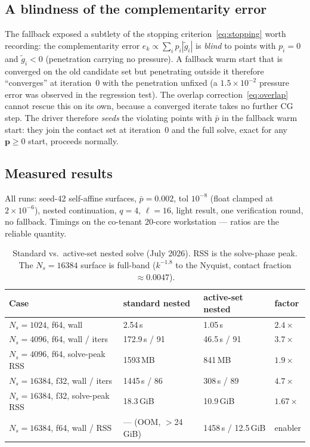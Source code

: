 \documentclass[11pt,a4paper]{article}
\newcommand{\bp}{\mathbf{p}}
\begin{document}
\subsection{A blindness of the complementarity error}
\label{sec:active-blind}

The fallback exposed a subtlety of the stopping
criterion~\eqref{eq:stopping} worth recording: the complementarity error
$e_k \propto \sum_i p_i |\tilde g_i|$ is \emph{blind} to points with
$p_i = 0$ and $\tilde g_i < 0$ (penetration carrying no pressure).  A fallback warm start that is converged on the old candidate set
but penetrating outside it therefore ``converges'' at iteration~0 with the
penetration unfixed (a $1.5\times10^{-2}$ pressure error was observed in the
regression test).  The overlap correction~\eqref{eq:overlap} cannot rescue
this on its own, because a converged iterate takes no further CG step.  The
driver therefore \emph{seeds} the violating points with $\bar p$ in the
fallback warm start: they join the contact set at iteration~0 and the full
solve, exact for any $\bp \geq 0$ start, proceeds normally.

\subsection{Measured results}
\label{sec:active-results}

All runs: seed-42 self-affine surfaces, $\bar p = 0.002$, tol $10^{-8}$
(float clamped at $2\times10^{-6}$), nested continuation, $q = 4$,
$\ell = 16$, light result, one verification round, no fallback.  Timings on
the co-tenant 20-core workstation --- ratios are the reliable quantity.

\begin{table}[ht]
\centering
\caption{Standard vs.\ active-set nested solve (July 2026).  RSS is the
         solve-phase peak.  The $N_s{=}16384$ surface is full-band
         ($k^{-1.8}$ to the Nyquist, contact fraction $\approx 0.0047$).}
\label{tab:active}
\begin{tabular}{@{}llll@{}}
\toprule
Case & standard nested & active-set nested & factor \\
\midrule
$N_s{=}1024$, f64, wall            & 2.54\,s        & 1.05\,s          & $2.4\times$ \\
$N_s{=}4096$, f64, wall / iters    & 172.9\,s / 91  & 46.5\,s / 91     & $3.7\times$ \\
$N_s{=}4096$, f64, solve-peak RSS  & 1593\,MB       & 841\,MB          & $1.9\times$ \\
$N_s{=}16384$, f32, wall / iters   & 1445\,s / 86   & 308\,s / 89      & $4.7\times$ \\
$N_s{=}16384$, f32, solve-peak RSS & 18.3\,GiB      & 10.9\,GiB        & $1.67\times$ \\
$N_s{=}16384$, f64, wall / RSS     & --- (OOM, $>$24\,GiB) & 1458\,s / 12.5\,GiB & enabler \\
\bottomrule
\end{tabular}
\end{table}
\end{document}
